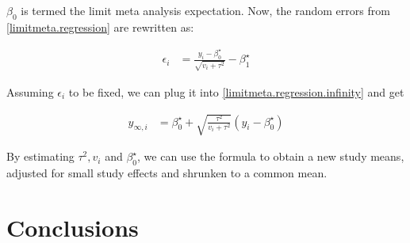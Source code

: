 \documentclass[11pt,a4paper,twoside]{book}\usepackage[]{graphicx}\usepackage[]{color}
\begin{document}
$\beta_{0}$ is termed the limit meta analysis expectation. Now, the random errors from \ref{limitmeta.regression} are rewritten as:

\begin{align}
\epsilon_{i} &= \frac{y_{i} - \beta_{0}^\star}{\sqrt{v_{i} + \tau^2}} - \beta_{1}^\star
\end{align}

Assuming $\epsilon_{i}$ to be fixed, we can plug it into \ref{limitmeta.regression.infinity} and get 

\begin{align}
y_{\infty,i} &= \beta_{0}^\star + \sqrt{\frac{\tau^2}{v_{i} + \tau^2}}(y_{i} - \beta_{0}^\star)
\end{align}

By estimating $\tau^2, v_{i}$ and  $\beta_{0}^\star$, we can use the formula to obtain a new study means, adjusted for small study effects and shrunken to a common mean. 







% 
% 
% 
% 
% 
% 





\chapter{Conclusions}
\end{document}
